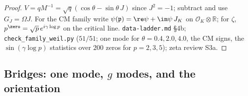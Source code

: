 \begin{proof}[Proof] $V = qM^{-1} = \sqrt q(\cos\theta-\sin\theta\,J)$ since $J^2 = -1$; subtract and use $G_J = \Omega J$. For the CM family write $\psi(\mathfrak p) = %
\re\psi+\im\psi\,J_K$ on $\mathcal O_K\otimes\mathbb R$; for $\zeta$, $p^{\zero} = \sqrt p\,e^{i\gamma\log p}$ on the critical line. \texttt{data-ladder.md} \S4b; %
\texttt{check\_family\_weil.py} ($51/51$; one mode for $\theta = 0.4,2.0,4.0$, the CM signs, the $\sin(\gamma\log p)$ statistics over $200$ zeros for $p = 2,3,5$); zeta review %
S3a.
\end{proof}

\subsection{Bridges: one mode, $g$ modes, and the orientation}

